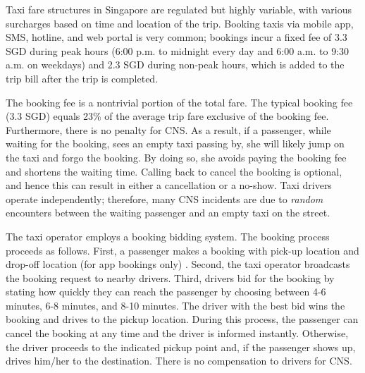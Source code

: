 \documentclass[reviewmode,AEJ]{AEA}
\begin{document}
Taxi fare structures in Singapore are regulated but highly variable, with various surcharges based on time and location of the trip. 
Booking taxis via mobile app, SMS, hotline, and web portal is very common; bookings incur a fixed fee of %
3.3 SGD during peak hours (6:00 p.m. to midnight every day and 6:00 a.m. to 9:30 a.m. on weekdays) and 2.3 SGD during non-peak hours, which is added to the trip bill after the trip is completed. 

The booking fee is a nontrivial portion of the total fare. The typical booking fee (3.3 SGD) equals 23\% of the average trip fare exclusive of the booking fee. Furthermore, there is no penalty for CNS.
As a result, if a passenger, while waiting for the booking, sees an empty taxi passing by, she will likely jump on the taxi and forgo the booking. By doing so, she avoids paying the booking fee and shortens the waiting time. Calling back to cancel the booking is optional, and hence this can result in either a cancellation or a no-show. Taxi drivers operate independently; therefore, many CNS incidents are due to \textit{random} encounters between the waiting passenger and an empty taxi on the street.

The taxi operator employs a booking bidding system. The booking process proceeds as follows. 
First, a passenger makes a booking %
with pick-up location and drop-off location (for app bookings only)%
. Second, the taxi operator broadcasts the booking request to 
nearby drivers. Third, drivers bid for the booking by stating how quickly they can reach the passenger 
by choosing between 4-6 minutes, 6-8 minutes, and 8-10 minutes. The driver with the best bid wins the
booking and drives to the pickup location. During this process, the passenger can cancel the booking
at any time and the driver is informed %
instantly. Otherwise, the driver proceeds
to the indicated pickup point and, if the passenger shows up, drives him/her to the destination. 
There is no compensation to drivers for CNS.
\end{document}

